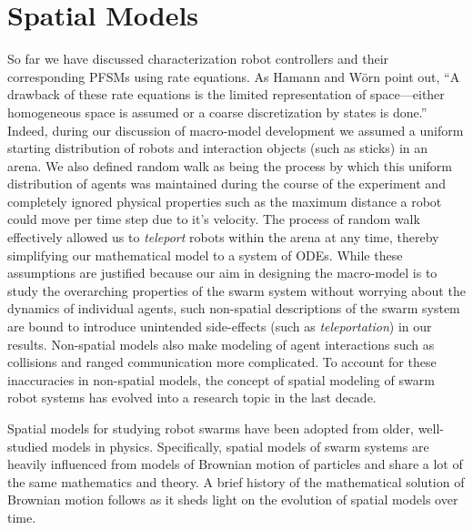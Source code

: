 \documentclass[Main.tex]{subfiles}
\begin{document}
\section{Spatial Models}\label{sec:spatial}
So far we have discussed characterization robot controllers and their corresponding PFSMs using rate equations. As Hamann and W\"{o}rn\citep{Hamann2008} point out, ``A drawback of these rate equations is the limited representation of space---either homogeneous space is assumed or a coarse discretization by states is done.'' Indeed, during our discussion of macro-model development we assumed a uniform starting distribution of robots and interaction objects (such as sticks) in an arena. We also defined random walk as being the process by which this uniform distribution of agents was maintained during the course of the experiment and completely ignored physical properties such as the maximum distance a robot could move per time step due to it's velocity. The process of random walk effectively allowed us to \emph{teleport} robots within the arena at any time, thereby simplifying our mathematical model to a system of ODEs. While these assumptions are justified because our aim in designing the macro-model is to study the overarching properties of the swarm system without worrying about the dynamics of individual agents, such non-spatial descriptions of the swarm system are bound to introduce unintended side-effects (such as \emph{teleportation}) in our results. Non-spatial models also make modeling of agent interactions such as collisions and ranged communication more complicated. To account for these inaccuracies in non-spatial models, the concept of spatial modeling of swarm robot systems has evolved into a research topic in the last decade.

Spatial models for studying robot swarms have been adopted from older, well-studied models in physics. Specifically, spatial models of swarm systems are heavily influenced from models of Brownian motion of particles and share a lot of the same mathematics and theory. A brief history of the mathematical solution of Brownian motion follows as it sheds light on the evolution of spatial models over time. 
\end{document}
